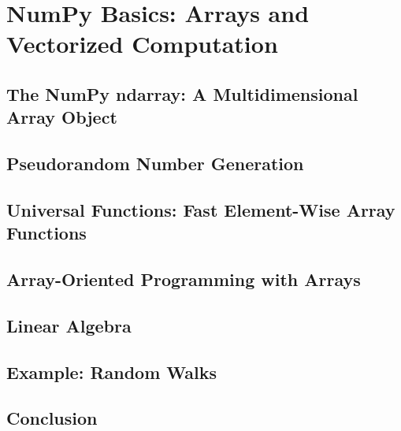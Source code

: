 \chapter{NumPy Basics: Arrays and Vectorized Computation}
\section{The NumPy ndarray: A Multidimensional Array Object}
\section{Pseudorandom Number Generation}
\section{Universal Functions: Fast Element-Wise Array Functions}
\section{Array-Oriented Programming with Arrays}
\section{Linear Algebra}
\section{Example: Random Walks}
\section{Conclusion}